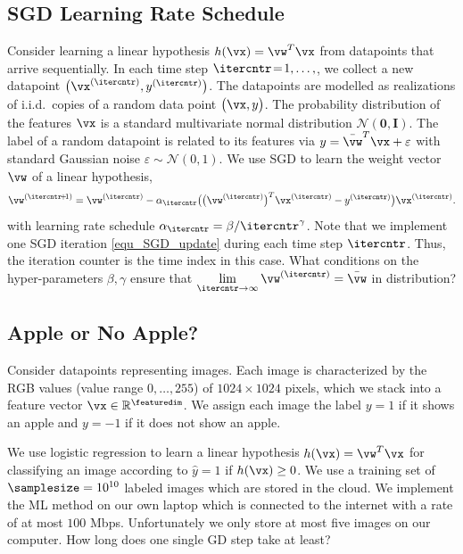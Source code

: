 \documentclass[12pt]{report}
\newcommand{\featurelen}{\featuredim}
\begin{document}
\subsection{SGD Learning Rate Schedule} 
\label{ex_SGD_learning_rate}
Consider learning a linear hypothesis $h(\vx) = \vw^{T} \vx$ from datapoints 
that arrive sequentially. In each time step $\itercntr\!=\!1,\ldots,$, we collect 
a new datapoint $\big(\vx^{(\itercntr)},y^{(\itercntr)} \big)$. The 
datapoints are modelled as realizations of i.i.d.\ copies of a random data point $\big(\vx,y\big)$. 
The probability distribution of the features $\vx$ is a standard 
multivariate normal distribution $\mathcal{N}(\mathbf{0},\mathbf{I})$. 
The label of a random datapoint is related to its features via $y = \bar{\vw}^{T} \vx+ \varepsilon$ with 
standard Gaussian noise $ \varepsilon \sim \mathcal{N}(0,1)$. 
We use SGD to learn the weight vector $\vw$ of a linear hypothesis, 
\begin{equation}
\label{equ_SGD_update}
\vw^{(\itercntr\!+\!1)} = \vw^{(\itercntr)} - \alpha_{\itercntr}  \big ( \big(\vw^{(\itercntr)}\big)^{T} \vx^{(\itercntr)} - y^{(\itercntr)} \big) \vx^{(\itercntr)}.
\end{equation} 
with learning rate schedule $\alpha_{\itercntr} = \beta/\itercntr^{\gamma}$. Note 
that we implement one SGD iteration \eqref{equ_SGD_update} during each time step $\itercntr$. 
Thus, the iteration counter is the time index in this case. 
What conditions on the hyper-parameters $\beta, \gamma$ ensure that 
$\lim\limits_{\itercntr \rightarrow \infty} \vw^{(\itercntr)} = \bar{\vw}$ in distribution?


\subsection{Apple or No Apple?} 
\label{ex_GD_distributed_data}
Consider datapoints representing images. Each image is characterized by 
the RGB values (value range $0,\ldots,255$) of $1024 \times 1024$ pixels, 
which we stack into a feature vector $\vx \in \mathbb{R}^{\featurelen}$.
We assign each image the label $y=1$ if it shows an 
apple and $y=-1$ if it does not show an apple. 

We use logistic regression to learn a linear hypothesis $h(\vx) = \vw^{T} \vx$ for classifying 
an image according to $\hat{y} =1$ if $h(\vx) \geq 0$. We use a training set 
of $\samplesize=10^{10}$ labeled images which are stored in the cloud. We implement 
the ML method on our own laptop which is connected to the internet with a rate 
of at most $100$ Mbps. Unfortunately we only store at most five images on our 
computer. How long does one single GD step take at least?
\end{document}
